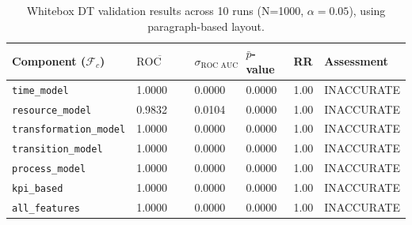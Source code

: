 \begin{table}[htbp]
  \centering
  \caption{Whitebox DT validation results across 10 runs (N=1000, $\alpha=0.05$), using paragraph-based layout.}
  \label{tab:results-whitebox-paragraph}
  \begin{tabular}{l l l l l p{3cm}}
    \toprule
    \textbf{Component ($\mathcal{F}_c$)} & \textbf{$\overline{\text{ROC AUC}}$} & \textbf{$\sigma_{\text{ROC AUC}}$} & \textbf{$\bar{p}$-value} & \textbf{RR} & \textbf{Assessment} \\
    \midrule
    \texttt{time\_model}                 & 1.0000                               & 0.0000                             & 0.0000                   & 1.00        & INACCURATE          \\
    \texttt{resource\_model}             & 0.9832                               & 0.0104                             & 0.0000                   & 1.00        & INACCURATE          \\
    \texttt{transformation\_model}       & 1.0000                               & 0.0000                             & 0.0000                   & 1.00        & INACCURATE          \\
    \texttt{transition\_model}           & 1.0000                               & 0.0000                             & 0.0000                   & 1.00        & INACCURATE          \\
    \texttt{process\_model}              & 1.0000                               & 0.0000                             & 0.0000                   & 1.00        & INACCURATE          \\
    \texttt{kpi\_based}                  & 1.0000                               & 0.0000                             & 0.0000                   & 1.00        & INACCURATE          \\
    \texttt{all\_features}               & 1.0000                               & 0.0000                             & 0.0000                   & 1.00        & INACCURATE          \\
    \bottomrule
  \end{tabular}
\end{table}


